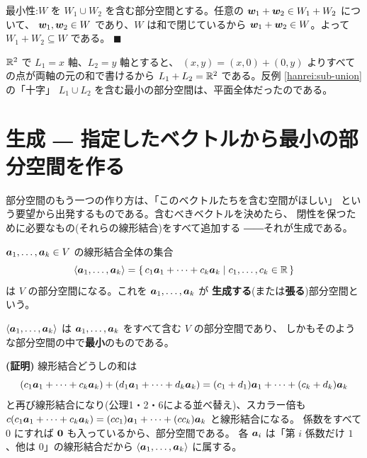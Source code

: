 最小性:$W$ を $W_1 \cup W_2$ を含む部分空間とする。任意の
$\bm{w}_1 + \bm{w}_2 \in W_1 + W_2$ について、
$\bm{w}_1, \bm{w}_2 \in W$ であり、$W$ は和で閉じているから
$\bm{w}_1 + \bm{w}_2 \in W$。よって $W_1 + W_2 \subseteq W$ である。
$\blacksquare$

\begin{rei}
$\mathbb{R}^2$ で $L_1 = x$ 軸、$L_2 = y$ 軸とすると、
$(x, y) = (x, 0) + (0, y)$ よりすべての点が両軸の元の和で書けるから
$L_1 + L_2 = \mathbb{R}^2$ である。反例 \ref{hanrei:sub-union} の「十字」
$L_1 \cup L_2$ を含む最小の部分空間は、平面全体だったのである。
\end{rei}

\section{生成 ― 指定したベクトルから最小の部分空間を作る}

部分空間のもう一つの作り方は、「このベクトルたちを含む空間がほしい」
という要望から出発するものである。含むべきベクトルを決めたら、
閉性を保つために必要なもの(それらの線形結合)をすべて追加する
――それが生成である。

\begin{teigi}[生成される部分空間]
$\bm{a}_1, \dots, \bm{a}_k \in V$ の線形結合全体の集合
\[
\langle \bm{a}_1, \dots, \bm{a}_k \rangle
= \{\, c_1\bm{a}_1 + \cdots + c_k\bm{a}_k \mid c_1, \dots, c_k \in \mathbb{R} \,\}
\]
は $V$ の部分空間になる。これを $\bm{a}_1, \dots, \bm{a}_k$ が
\textbf{生成する}(または\textbf{張る})部分空間という。
\end{teigi}

\begin{teiri}[生成された部分空間の最小性]\label{thm:span-min}
$\langle \bm{a}_1, \dots, \bm{a}_k \rangle$ は
$\bm{a}_1, \dots, \bm{a}_k$ をすべて含む $V$ の部分空間であり、
しかもそのような部分空間の中で\textbf{最小}のものである。
\end{teiri}

\noindent\textbf{(証明)}\quad
線形結合どうしの和は
\[
(c_1\bm{a}_1 + \cdots + c_k\bm{a}_k)
+ (d_1\bm{a}_1 + \cdots + d_k\bm{a}_k)
= (c_1 + d_1)\bm{a}_1 + \cdots + (c_k + d_k)\bm{a}_k
\]
と再び線形結合になり(公理1・2・6による並べ替え)、スカラー倍も
$c(c_1\bm{a}_1 + \cdots + c_k\bm{a}_k)
= (cc_1)\bm{a}_1 + \cdots + (cc_k)\bm{a}_k$ と線形結合になる。
係数をすべて $0$ にすれば $\bm{0}$ も入っているから、部分空間である。
各 $\bm{a}_i$ は「第 $i$ 係数だけ $1$、他は $0$」の線形結合だから
$\langle \bm{a}_1, \dots, \bm{a}_k \rangle$ に属する。

